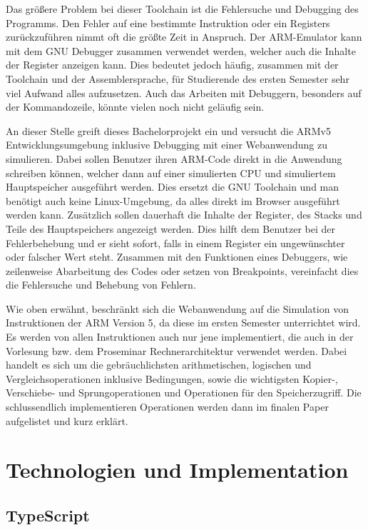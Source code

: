 \documentclass[a4paper, 11pt, onecolumn]{article}
\begin{document}
Das größere Problem bei dieser Toolchain ist die Fehlersuche und Debugging des Programms. Den Fehler auf eine bestimmte Instruktion oder ein Registers zurückzuführen nimmt oft die größte Zeit in Anspruch. Der ARM-Emulator kann mit dem GNU Debugger \cite{gdb} zusammen verwendet werden, welcher auch die Inhalte der Register anzeigen kann. Dies bedeutet jedoch häufig, zusammen mit der Toolchain und der Assemblersprache, für Studierende des ersten Semester sehr viel Aufwand alles aufzusetzen. Auch das Arbeiten mit Debuggern, besonders auf der Kommandozeile, könnte vielen noch nicht geläufig sein. 

An dieser Stelle greift dieses Bachelorprojekt ein und versucht die ARMv5 Entwicklungsumgebung inklusive Debugging mit einer Webanwendung zu simulieren. Dabei sollen Benutzer ihren ARM-Code direkt in die Anwendung schreiben können, welcher dann auf einer simulierten CPU und simuliertem Hauptspeicher ausgeführt werden. Dies ersetzt die GNU Toolchain und man benötigt auch keine Linux-Umgebung, da alles direkt im Browser ausgeführt werden kann. Zusätzlich sollen dauerhaft die Inhalte der Register, des Stacks und Teile des Hauptspeichers angezeigt werden. Dies hilft dem Benutzer bei der Fehlerbehebung und er sieht sofort, falls in einem Register ein ungewünschter oder falscher Wert steht. Zusammen mit den Funktionen eines Debuggers, wie zeilenweise Abarbeitung des Codes oder setzen von Breakpoints, vereinfacht dies die Fehlersuche und Behebung von Fehlern.

Wie oben erwähnt, beschränkt sich die Webanwendung auf die Simulation von Instruktionen der ARM Version 5, da diese im ersten Semester unterrichtet wird. Es werden von allen Instruktionen auch nur jene implementiert, die auch in der Vorlesung bzw. dem Proseminar Rechnerarchitektur verwendet werden. Dabei handelt es sich um die gebräuchlichsten arithmetischen, logischen und Vergleichsoperationen inklusive Bedingungen, sowie die wichtigsten Kopier-, Verschiebe- und Sprungoperationen und Operationen für den Speicherzugriff. Die schlussendlich implementieren Operationen werden dann im finalen Paper aufgelistet und kurz erklärt.

\section{Technologien und Implementation}

\subsection{TypeScript}
\end{document}
